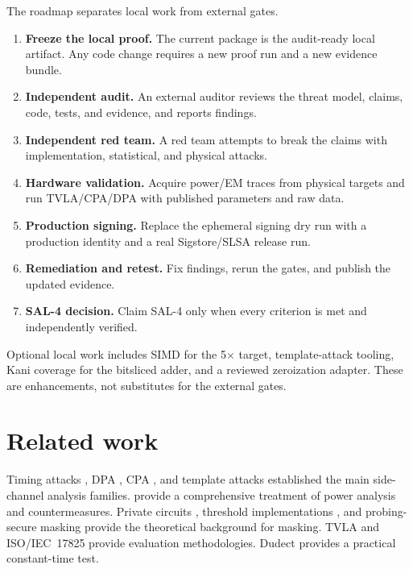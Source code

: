 \documentclass[11pt,a4paper]{article}
\theoremstyle{plain}
\theoremstyle{definition}
\theoremstyle{remark}
\begin{document}
The roadmap separates local work from external gates.

\begin{enumerate}[leftmargin=1.5em]
  \item \textbf{Freeze the local proof.} The current package is the audit-ready local
        artifact. Any code change requires a new proof run and a new evidence bundle.
  \item \textbf{Independent audit.} An external auditor reviews the threat model,
        claims, code, tests, and evidence, and reports findings.
  \item \textbf{Independent red team.} A red team attempts to break the claims with
        implementation, statistical, and physical attacks.
  \item \textbf{Hardware validation.} Acquire power/EM traces from physical targets and
        run TVLA/CPA/DPA with published parameters and raw data.
  \item \textbf{Production signing.} Replace the ephemeral signing dry run with a
        production identity and a real Sigstore/SLSA release run.
  \item \textbf{Remediation and retest.} Fix findings, rerun the gates, and publish the
        updated evidence.
  \item \textbf{SAL-4 decision.} Claim SAL-4 only when every criterion is met and
        independently verified.
\end{enumerate}

Optional local work includes SIMD for the 5$\times$ target, template-attack tooling,
Kani coverage for the bitsliced adder, and a reviewed zeroization adapter. These are
enhancements, not substitutes for the external gates.

\section{Related work}\label{sec:related}

Timing attacks \citep{kocher1996timing}, DPA \citep{kocher1999dpa}, CPA
\citep{brier2004cpa}, and template attacks \citep{chari2002template} established the
main side-channel analysis families. \citet{mangard2007power} provide a comprehensive
treatment of power analysis and countermeasures. Private circuits
\citep{ishai2003private}, threshold implementations \citep{nikova2006threshold}, and
probing-secure masking \citep{rivain2010probing} provide the theoretical background for
masking. TVLA \citep{goodwill2011tvla,schneider2015leakage} and ISO/IEC~17825
\citep{iso17825} provide evaluation methodologies. Dudect
\citep{reparaz2017dudect} provides a practical constant-time test.
\end{document}
